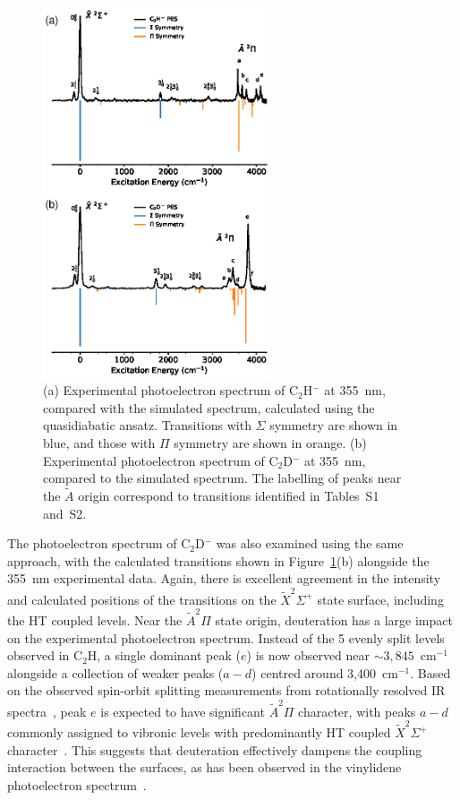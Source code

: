 \documentclass[aip,graphicx]{revtex4-1}
\begin{document}
\begin{figure}[th!]
	\includegraphics[width=0.6\textwidth]{figures/Fig3}
	\caption{(a) Experimental photoelectron spectrum of C$_2$H$^-$ at 355~nm, compared with the simulated spectrum, calculated using the quasidiabatic ansatz. Transitions with $\Sigma$ symmetry are shown in blue, and those with $\Pi$ symmetry are shown in orange. (b) Experimental photoelectron spectrum of C$_2$D$^-$ at 355~nm, compared to the simulated spectrum. The labelling of peaks near the $\tilde{A}$ origin correspond to transitions identified in Tables~S1 and~S2.}
	\label{fig:3}
\end{figure}

The photoelectron spectrum of C$_2$D$^-$ was also examined using the same approach, with the calculated transitions shown in Figure~\ref{fig:3}(b) alongside the 355~nm experimental data. Again, there is excellent agreement in the intensity and calculated positions of the transitions on the $\tilde{X} ^2\Sigma^+$ state surface, including the HT coupled levels. Near the $\tilde{A} ^2\Pi$ state origin, deuteration has a large impact on the experimental photoelectron spectrum. Instead of the 5 evenly split levels observed in C$_2$H, a single dominant peak ($e$) is now observed near $\sim3,845$~cm$^{-1}$ alongside a collection of weaker peaks ($a-d$) centred around 3,400~cm$^{-1}$. Based on the observed spin-orbit splitting measurements from rotationally resolved IR spectra~\cite{yan87,sch98,ste88}, peak $e$ is expected to have significant $\tilde{A} ^2\Pi$ character, with peaks $a-d$ commonly assigned to vibronic levels with predominantly HT coupled $\tilde{X} ^2\Sigma^+$ character~\cite{yan87,hsu95,chi99,wil11}. This suggests that deuteration effectively dampens the coupling interaction between the surfaces, as has been observed in the vinylidene photoelectron spectrum~\cite{dev17}.
\end{document}
